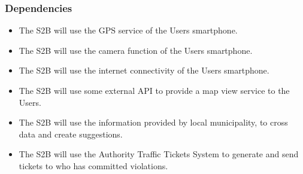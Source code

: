 \subsubsection{Dependencies}
\begin{itemize}
    \item The S2B will use the GPS service of the Users smartphone.
    \item The S2B will use the camera function of the Users smartphone.
    \item The S2B will use the internet connectivity of the Users smartphone.
    \item The S2B will use some external API to provide  a map view service to the Users.
    \item The S2B will use the information provided by local municipality, to cross data and create suggestions.
    \item The S2B will use the Authority Traffic Tickets System to generate and send tickets to who has committed violations.\\
\end{itemize}






